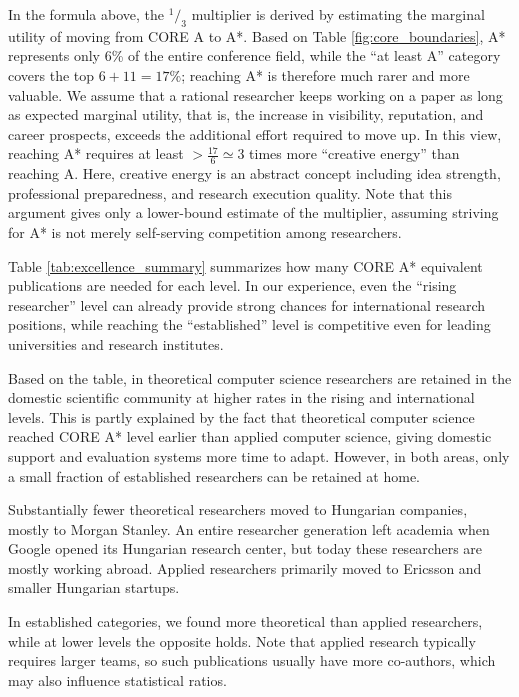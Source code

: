 \documentclass[12pt,a4paper]{article}
\newcommand{\hh}[1]{${}^{\!1}\!/_{#1}$}
\begin{document}
In the formula above, the \hh{3} multiplier is derived by estimating the marginal utility of moving from CORE A to A\!*. Based on Table \ref{fig:core_boundaries}, A\!* represents only 6\% of the entire conference field, while the ``at least A'' category covers the top $6+11=17\%$; reaching A\!* is therefore much rarer and more valuable. We assume that a rational researcher keeps working on a paper as long as expected marginal utility, that is, the increase in visibility, reputation, and career prospects, exceeds the additional effort required to move up. In this view, reaching A\!* requires at least $> \frac{17}{6} \simeq 3$ times more ``creative energy'' than reaching A. Here, creative energy is an abstract concept including idea strength, professional preparedness, and research execution quality. Note that this argument gives only a lower-bound estimate of the multiplier, assuming striving for A\!* is not merely self-serving competition among researchers.

Table \ref{tab:excellence_summary} summarizes how many CORE A\!* equivalent publications are needed for each level. In our experience, even the ``rising researcher'' level can already provide strong chances for international research positions, while reaching the ``established'' level is competitive even for leading universities and research institutes.



Based on the table, in theoretical computer science researchers are retained in the domestic scientific community at higher rates in the rising and international levels. This is partly explained by the fact that theoretical computer science reached CORE A\!* level earlier than applied computer science, giving domestic support and evaluation systems more time to adapt. However, in both areas, only a small fraction of established researchers can be retained at home.

Substantially fewer theoretical researchers moved to Hungarian companies, mostly to Morgan Stanley. An entire researcher generation left academia when Google opened its Hungarian research center, but today these researchers are mostly working abroad. Applied researchers primarily moved to Ericsson and smaller Hungarian startups.

In established categories, we found more theoretical than applied researchers, while at lower levels the opposite holds. Note that applied research typically requires larger teams, so such publications usually have more co-authors, which may also influence statistical ratios.
\end{document}
